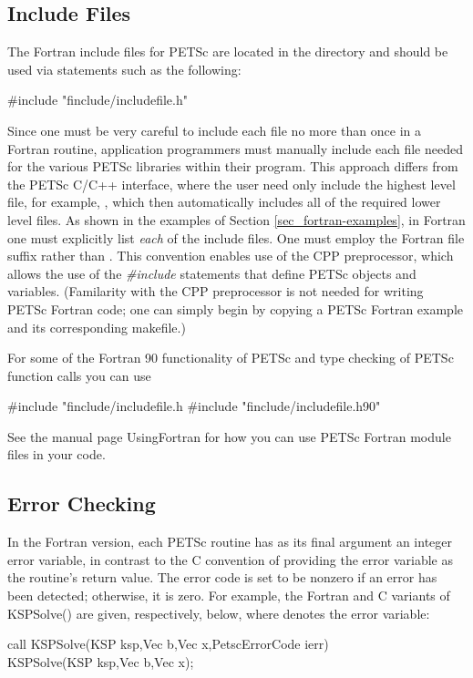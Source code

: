 \subsection{Include Files}
\label{sec_fortran_includes}

The Fortran include files for PETSc are located in the directory
 and should be used via statements
such as the following:
\begin{tabbing}
    \#include "finclude/includefile.h"
\end{tabbing}
Since one must be very careful to include each file no more than once
in a Fortran routine, application programmers must manually include
each file needed for the various PETSc libraries within their
program.  This approach differs from the PETSc C/C++ interface, where
the user need only include the highest level file, for example, , which then automatically includes all of the required lower
level files.  As shown in the examples of Section
\ref{sec_fortran-examples}, in Fortran one must explicitly list {\em
each} of the include files. One must employ
the Fortran file suffix 
rather than .  This convention enables use of the CPP
preprocessor, which allows the use of the {\em \#include} statements
that define PETSc objects and variables. (Familarity with the CPP
preprocessor is not needed for writing PETSc Fortran code; one can simply
begin by copying a PETSc Fortran example and its corresponding
makefile.)

For some of the Fortran 90 functionality of PETSc and type checking
of PETSc function calls you can use
\begin{tabbing}
    \#include "finclude/includefile.h
    \#include "finclude/includefile.h90"
\end{tabbing}
See the manual page UsingFortran for how you can use PETSc Fortran
module files in your code.

\subsection{Error Checking}
\label{sec_fortran_errors}

In the Fortran version, each PETSc routine has as its final argument
an integer error variable, in contrast to the C convention of
providing the error variable as the routine's return value.  The error
code is set to be nonzero if an error has been detected; otherwise, it
is zero.  For example, the Fortran and C variants of KSPSolve() are
given, respectively, below, where  denotes the error variable:
\begin{tabbing}
   call KSPSolve(KSP ksp,Vec b,Vec x,PetscErrorCode ierr)\\
  KSPSolve(KSP ksp,Vec b,Vec x);
\end{tabbing}

